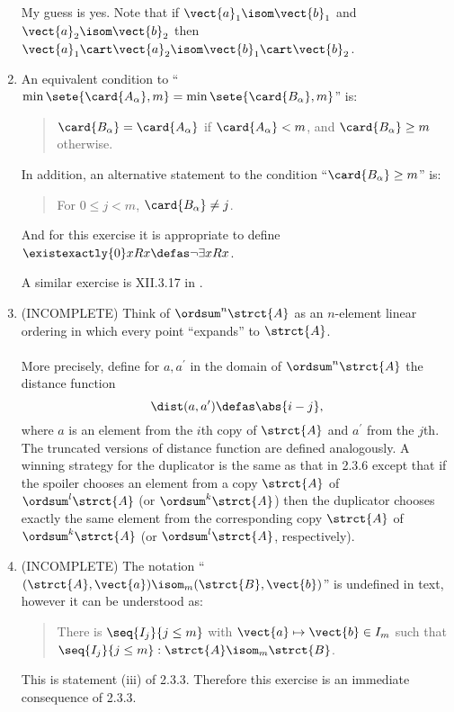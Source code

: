 \begin{enumerate}[1.]
My guess is yes. Note that if $\vect{a}_1 \isom \vect{b}_1$ and $\vect{a}_2 \isom \vect{b}_2$ then $\vect{a}_1 \cart \vect{a}_2 \isom \vect{b}_1 \cart \vect{b}_2$.
%
\item {} An equivalent condition to ``$\min\sete{\card{A_\alpha}, m} = \min\sete{\card{B_\alpha}, m}$'' is:
\begin{quote}
$\card{B_\alpha} = \card{A_\alpha}$ if $\card{A_\alpha} < m$, and $\card{B_\alpha} \geq m$ otherwise.
\end{quote}
In addition, an alternative statement to the condition ``$\card{B_\alpha} \geq m$'' is:
\begin{quote}
For $0 \leq j < m$, $\card{B_\alpha} \neq j$.
\end{quote}
And for this exercise it is appropriate to define $\existexactly{0}x Rx \defas \neg\exists x Rx$.
\begin{remark}
A similar exercise is XII.3.17 in \cite{EFT}.
\end{remark}
%
\item {} (INCOMPLETE)
Think of $\ordsum^n \strct{A}$ as an $n$-element linear ordering in which every point ``expands'' to $\strct{A}$.\\
\medskip\\
More precisely, define for $a, a^\prime$ in the domain of $\ordsum^n \strct{A}$ the distance function
\[
\dist(a, a^\prime) \defas \abs{i - j},
\]
where $a$ is an element from the $i$th copy of $\strct{A}$ and $a^\prime$ from the $j$th. The truncated versions of distance function are defined analogously. A winning strategy for the duplicator is the same as that in 2.3.6 except that if the spoiler chooses an element from a copy $\strct{A}$ of $\ordsum^l \strct{A}$ (or $\ordsum^k \strct{A}$) then the duplicator chooses exactly the same element from the corresponding copy $\strct{A}$ of $\ordsum^k \strct{A}$ (or $\ordsum^l \strct{A}$, respectively).
%
\item {} (INCOMPLETE)
The notation ``$(\strct{A}, \vect{a}) \isom_m (\strct{B}, \vect{b})$'' is undefined in text, however it can be understood as:
\begin{quote}
There is $\seq{I_j}{j \leq m}$ with $\vect{a} \mapsto \vect{b} \in I_m$ such that $\seq{I_j}{j \leq m} : \strct{A} \isom_m \strct{B}$.
\end{quote}
This is statement (iii) of 2.3.3. Therefore this exercise is an immediate consequence of 2.3.3.
\begin{remark}

\end{remark}
\end{enumerate}
